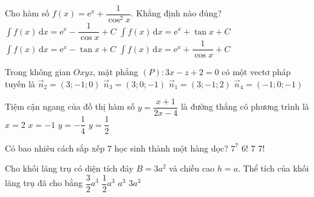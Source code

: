 \begin{ex}%
	Cho hàm số $f(x)=\mathrm{e}^x+\dfrac{1}{\cos^2x}$. Khẳng định nào đúng?
	\choice
	{$\displaystyle\int f(x) \mathrm{\,d}x=\mathrm{e}^x-\dfrac{1}{\cos x}+C$}
	{\True $\displaystyle\int f(x) \mathrm{\,d}x=\mathrm{e}^x+\tan x+C$}
	{$\displaystyle\int f(x) \mathrm{\,d}x=\mathrm{e}^x-\tan x+C$}
	{$\displaystyle\int f(x) \mathrm{\,d}x=\mathrm{e}^x+\dfrac{1}{\cos x}+C$}
\end{ex}
\begin{ex}%
	Trong không gian $Oxyz$, mặt phẳng $(P)\colon 3x-z+2=0$ có một vectơ pháp tuyến là
	\choice
	{$\vec{n}_2=(3;-1;0)$}
	{\True $\vec{n}_3=(3;0;-1)$}
	{$\vec{n}_1=(3;-1;2)$}
	{$\vec{n}_4=(-1;0;-1)$}
\end{ex}
\begin{ex}%
	Tiệm cận ngang của đồ thị hàm số $y=\dfrac{x+1}{2x-4}$ là đường thẳng có phương trình là
	\choice
	{$x=2$}
	{$x=-1$}
	{$y=-\dfrac{1}{4}$}
	{\True $y=\dfrac{1}{2}$}
\end{ex}
\begin{ex}%
	Có bao nhiêu cách sắp xếp $7$ học sinh thành một hàng dọc?
	\choice
	{$7^7$}
	{$6!$}
	{$7$}
	{\True $7!$}
\end{ex}
\begin{ex}%
	Cho khối lăng trụ có diện tích đáy $B=3a^2$ và chiều cao $h=a$. Thể tích của khối lăng trụ đã cho bằng
	\choice
	{$\dfrac{3}{2}a^3$}
	{$\dfrac{1}{2}a^3$}
	{$a^3$}
	{\True $3a^3$}
\end{ex}

